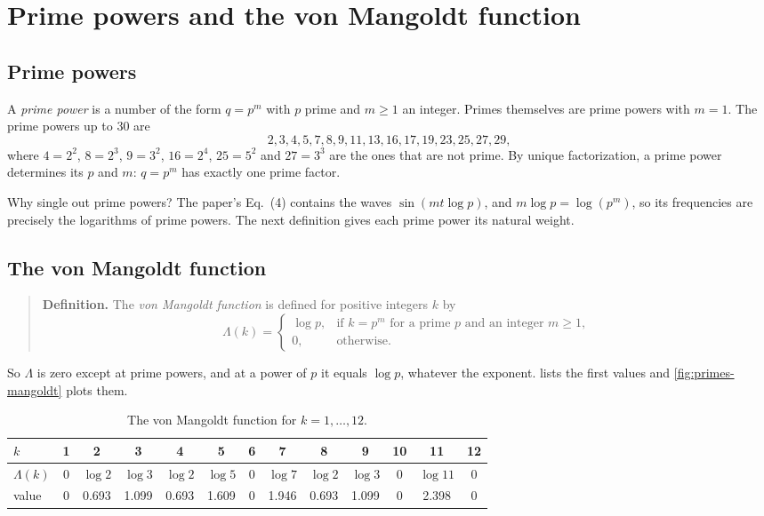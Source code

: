 \section{Prime powers and the von Mangoldt function}\label{sec:primes-mangoldt}

\subsection{Prime powers}

A \emph{prime power} is a number of the form $q=p^m$ with $p$ prime and $m\ge1$ an integer. Primes themselves are prime powers with $m=1$. The prime powers up to 30 are
\[
2,3,4,5,7,8,9,11,13,16,17,19,23,25,27,29 ,
\]
where $4=2^2$, $8=2^3$, $9=3^2$, $16=2^4$, $25=5^2$ and $27=3^3$ are the ones that are not prime. By unique factorization, a prime power determines its $p$ and $m$: $q=p^m$ has exactly one prime factor.

Why single out prime powers? The paper's Eq.~(4) contains the waves $\sin(mt\log p)$, and $m\log p=\log(p^m)$, so its frequencies are precisely the logarithms of prime powers. The next definition gives each prime power its natural weight.

\subsection{The von Mangoldt function}

\begin{quote}
\textbf{Definition.} The \emph{von Mangoldt function} is defined for positive integers $k$ by
\begin{equation}
\Lambda(k)=\begin{cases}\log p, & \text{if } k=p^m \text{ for a prime } p \text{ and an integer } m\ge1,\\[2pt] 0, & \text{otherwise.}\end{cases}
\label{eq:primes-Lambda}
\end{equation}
\end{quote}

So $\Lambda$ is zero except at prime powers, and at a power of $p$ it equals $\log p$, whatever the exponent.  lists the first values and \cref{fig:primes-mangoldt} plots them.

\begin{table}[htbp]\centering
\caption{The von Mangoldt function for $k=1,\dots,12$.}
\label{tab:primes-Lambda}
\begin{tabular}{lcccccccccccc}
\toprule
$k$ & 1 & 2 & 3 & 4 & 5 & 6 & 7 & 8 & 9 & 10 & 11 & 12\\
\midrule
$\Lambda(k)$ & 0 & $\log2$ & $\log3$ & $\log2$ & $\log5$ & 0 & $\log7$ & $\log2$ & $\log3$ & 0 & $\log11$ & 0\\
value & 0 & 0.693 & 1.099 & 0.693 & 1.609 & 0 & 1.946 & 0.693 & 1.099 & 0 & 2.398 & 0\\
\bottomrule
\end{tabular}
\end{table}

